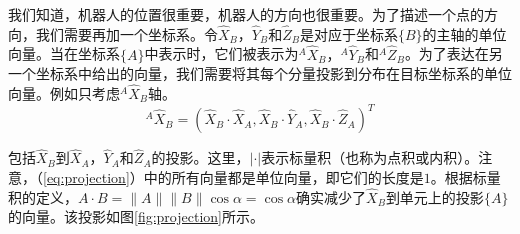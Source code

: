 我们知道，机器人的位置很重要，机器人的方向也很重要。为了描述一个点的方向，我们需要再加一个坐标系。令$\hat{X}_B$，$\hat{Y}_B$和$\hat{Z}_B$是对应于坐标系$\{B\}$的主轴的单位向量。当在坐标系$\{A\}$中表示时，它们被表示为$^A\hat{X}_B，^A\hat{Y}_B$和$^A\hat{Z}_B$。为了表达在另一个坐标系中给出的向量，我们需要将其每个分量投影到分布在目标坐标系的单位向量。例如只考虑$^A\hat{X}_B$轴。
\begin{equation}\label{eq:projection}
^A\hat{X}_B=(\hat{X}_B\cdot\hat{X}_A, \hat{X}_B\cdot\hat{Y}_A,\hat{X}_B\cdot\hat{Z}_A)^T
\end{equation}


包括$\hat{X}_B$到$\hat{X}_A$，$\hat{Y}_A$和$\hat{Z}_A$的投影。这里，$|\cdot|$表示标量积（也称为点积或内积）。注意，（\ref{eq:projection}）中的所有向量都是单位向量，即它们的长度是$1$。根据标量积的定义，$ A\cdot B =\|A\|\|B\|\cos \alpha=\cos\alpha$确实减少了$\hat{X}_B$到单元上的投影$\{A\}$的向量。该投影如图\ref{fig:projection}所示。

